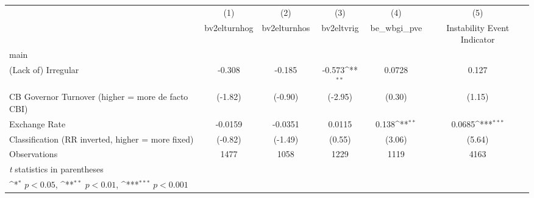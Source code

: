 {
\def\sym#1{\ifmmode^{#1}\else\(^{#1}\)\fi}
\begin{tabular}{l*{5}{c}}
\hline\hline
                    &\multicolumn{1}{c}{(1)}&\multicolumn{1}{c}{(2)}&\multicolumn{1}{c}{(3)}&\multicolumn{1}{c}{(4)}&\multicolumn{1}{c}{(5)}\\
                    &\multicolumn{1}{c}{bv2elturnhog}&\multicolumn{1}{c}{bv2elturnhos}&\multicolumn{1}{c}{bv2eltvrig}&\multicolumn{1}{c}{be\_wbgi\_pve}&\multicolumn{1}{c}{Instability Event Indicator}\\
\hline
main                &                     &                     &                     &                     &                     \\
(Lack of) Irregular &      -0.308         &      -0.185         &      -0.573\sym{**} &      0.0728         &       0.127         \\
CB Governor Turnover (higher = more de facto CBI)&     (-1.82)         &     (-0.90)         &     (-2.95)         &      (0.30)         &      (1.15)         \\
[1em]
Exchange Rate       &     -0.0159         &     -0.0351         &      0.0115         &       0.138\sym{**} &      0.0685\sym{***}\\
Classification (RR inverted, higher = more fixed)&     (-0.82)         &     (-1.49)         &      (0.55)         &      (3.06)         &      (5.64)         \\
\hline
Observations        &        1477         &        1058         &        1229         &        1119         &        4163         \\
\hline\hline
\multicolumn{6}{l}{\footnotesize \textit{t} statistics in parentheses}\\
\multicolumn{6}{l}{\footnotesize \sym{*} \(p<0.05\), \sym{**} \(p<0.01\), \sym{***} \(p<0.001\)}\\
\end{tabular}
}
